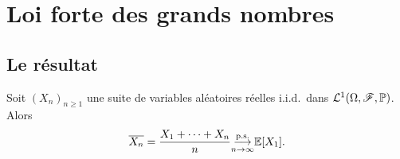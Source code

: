 \section{Loi forte des grands nombres} %

\subsection{Le résultat} %

\begin{theorem}
    Soit \({(X_n)}_{n\geq 1}\) une suite de variables aléatoires
    réelles i.i.d.\ dans \(\mathcal L^1(\Omega, \mathscr{F}, \mathbb{P})\).
    Alors
    \begin{equation*}
        \overline{X_n} = \frac{X_1 + \cdots + X_n}{n} \underset{n\to\infty}{{\overset{\text{p.s.}}{\longrightarrow}}} \mathbb{E}[X_1].
    \end{equation*}
\end{theorem}